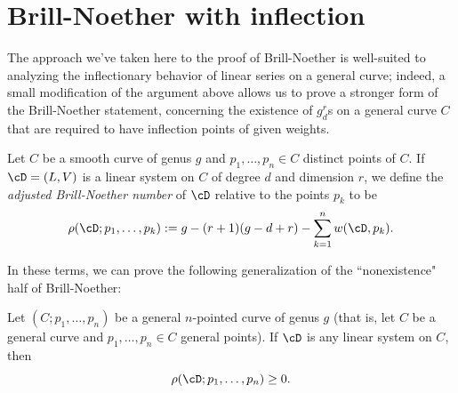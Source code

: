 \section{Brill-Noether with inflection}

The approach we've taken here to the proof of Brill-Noether is well-suited to analyzing the inflectionary behavior of linear series on a general curve; indeed, a small modification of the argument above allows us to prove a stronger form of the Brill-Noether statement, concerning the existence of $g^r_d$s on a general curve $C$ that are required to
 have inflection points of given weights.

\begin{definition}
Let $C$ be a smooth curve of genus $g$ and $p_1,\dots,p_n \in C$ distinct points of $C$. If $\cD = (L,V)$ is a linear system on $C$ of degree $d$ and dimension $r$, we define the \emph{adjusted Brill-Noether number} of $\cD$ relative to the points $p_k$ to be
$$
\rho(\cD; p_1,\dots,p_k) := g - (r+1)(g-d+r) - \sum_{k=1}^n w(\cD,p_k).
$$
\end{definition}

In these terms, we can prove the following generalization of the ``nonexistence" half of Brill-Noether:

\begin{theorem}\label{Brill-Noether with inflection}
Let $(C;p_1,\dots,p_n)$ be a general $n$-pointed curve of genus $g$ (that is, let $C$ be a general curve and $p_1,\dots,p_n \in C$ general points). If $\cD$ is any linear system on $C$, then
$$
\rho(\cD; p_1,\dots,p_n) \geq 0.
$$
\end{theorem}

